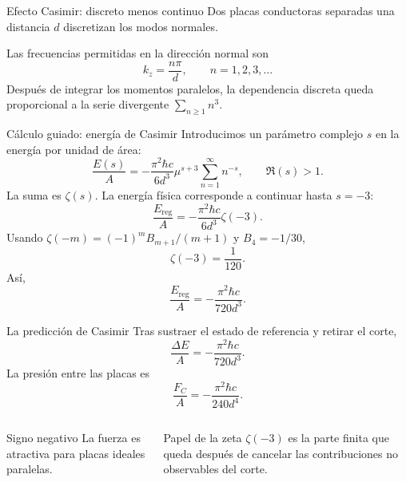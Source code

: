 \documentclass[aspectratio=169,11pt]{beamer}
\newcommand{\reg}{\operatorname{reg}}
\begin{document}
\begin{frame}{Efecto Casimir: discreto menos continuo}
  Dos placas conductoras separadas una distancia $d$ discretizan los modos normales.
  \begin{center}
  \end{center}
  \pause
  Las frecuencias permitidas en la dirección normal son
  \[
    k_z=\frac{n\pi}{d},\qquad n=1,2,3,\ldots
  \]
  \pause
  Después de integrar los momentos paralelos, la dependencia discreta queda
  proporcional a la serie divergente $\sum_{n\ge1}n^3$.
\end{frame}

\begin{frame}{Cálculo guiado: energía de Casimir}
  Introducimos un parámetro complejo $s$ en la energía por unidad de área:
  \[
    \frac{E(s)}{A}
      =-\frac{\pi^2\hbar c}{6d^3}\mu^{s+3}
       \sum_{n=1}^{\infty}n^{-s},
      \qquad \Re(s)>1.
  \]
  \pause
  La suma es $\zeta(s)$. La energía física corresponde a continuar hasta $s=-3$:
  \[
    \frac{E_{\reg}}{A}
      =-\frac{\pi^2\hbar c}{6d^3}\zeta(-3).
  \]
  \pause
  Usando $\zeta(-m)=(-1)^m B_{m+1}/(m+1)$ y $B_4=-1/30$,
  \[
    \zeta(-3)=\frac{1}{120}.
  \]
  \pause
  Así,
  \[
    \boxed{\frac{E_{\reg}}{A}=-\frac{\pi^2\hbar c}{720d^3}.}
  \]
\end{frame}

\begin{frame}{La predicción de Casimir}
  Tras sustraer el estado de referencia y retirar el corte,
  \[
    \frac{\Delta E}{A}=-\frac{\pi^2\hbar c}{720d^3}.
  \]
  \pause
  La presión entre las placas es
  \[
    \boxed{\frac{F_C}{A}=-\frac{\pi^2\hbar c}{240d^4}}.
  \]
  \pause
  \begin{columns}[T,onlytextwidth]
      \begin{block}{Signo negativo}
        La fuerza es atractiva para placas ideales paralelas.
      \end{block}
      \pause
      \begin{block}{Papel de la zeta}
        $\zeta(-3)$ es la parte finita que queda después de cancelar las contribuciones
        no observables del corte.
      \end{block}
  \end{columns}
\end{frame}
\end{document}

